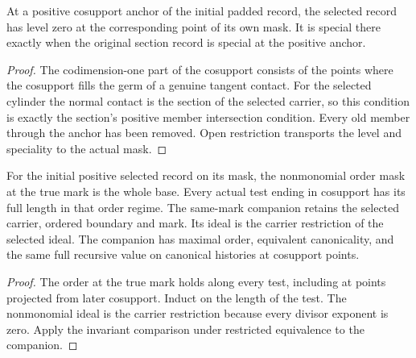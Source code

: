 \begin{theorem}
\label{hir:g1-initial-positive-special-recoding}
\leanok
At a positive cosupport anchor of the initial padded record, the
selected record has level zero at the corresponding point of its own
mask. It is special there exactly when the original section record is
special at the positive anchor.
\end{theorem}
\begin{proof}
The codimension-one part of the cosupport consists of the points where
the cosupport fills the germ of a genuine tangent contact. For the
selected cylinder the normal contact is the section of the selected
carrier, so this condition is exactly the section's positive member
intersection condition. Every old member through the anchor has been
removed. Open restriction transports the level and speciality to the
actual mask.
\end{proof}

\begin{theorem}
\label{hir:g1-initial-selected-order-phase}
\leanok
For the initial positive selected record on its mask, the nonmonomial
order mask at the true mark is the whole base. Every actual test ending
in cosupport has its full length in that order regime. The same-mark
companion retains the selected carrier, ordered boundary and mark. Its
ideal is the carrier restriction of the selected ideal. The companion
has maximal order, equivalent canonicality, and the same full
recursive value on canonical histories at cosupport points.
\end{theorem}
\begin{proof}
The order at the true mark holds along every test, including at points
projected from later cosupport. Induct on the length of the test. The
nonmonomial ideal is the carrier restriction because every divisor
exponent is zero. Apply the invariant comparison under restricted
equivalence to the companion.
\end{proof}

